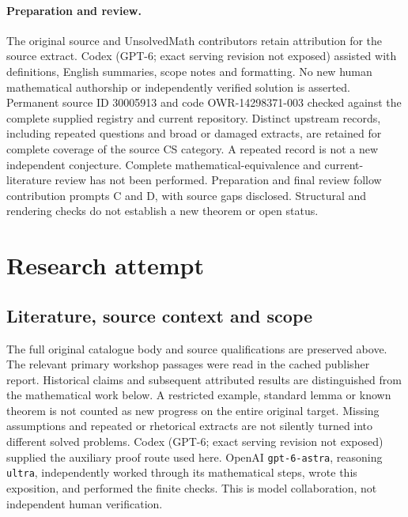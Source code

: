 \documentclass[11pt]{article}
\begin{document}
\paragraph{Preparation and review.}
The original source and UnsolvedMath contributors retain attribution for the source extract. Codex (GPT-6; exact serving revision not exposed) assisted with definitions, English summaries, scope notes and formatting. No new human mathematical authorship or independently verified solution is asserted. Permanent source ID 30005913 and code OWR-14298371-003 checked against the complete supplied registry and current repository. Distinct upstream records, including repeated questions and broad or damaged extracts, are retained for complete coverage of the source CS category. A repeated record is not a new independent conjecture. Complete mathematical-equivalence and current-literature review has not been performed. Preparation and final review follow contribution prompts C and D, with source gaps disclosed. Structural and rendering checks do not establish a new theorem or open status.
\label{end:30005913}

\section{Research attempt}
\subsection{Literature, source context and scope}
The full original catalogue body and source qualifications are preserved above. The relevant primary workshop passages were read in the cached publisher report. Historical claims and subsequent attributed results are distinguished from the mathematical work below. A restricted example, standard lemma or known theorem is not counted as new progress on the entire original target. Missing assumptions and repeated or rhetorical extracts are not silently turned into different solved problems.
Codex (GPT-6; exact serving revision not exposed) supplied the auxiliary proof route used here. OpenAI \texttt{gpt-6-astra}, reasoning \texttt{ultra}, independently worked through its mathematical steps, wrote this exposition, and performed the finite checks. This is model collaboration, not independent human verification.
\end{document}
